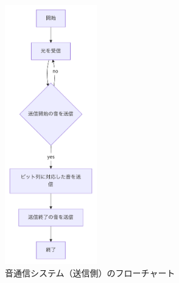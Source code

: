 \documentclass[a4j,11pt,dvipdfmx]{jsarticle}
\begin{document}
\begin{figure}[h]
    \centering
    \includegraphics[width=40mm]{../img/flow_sound_tx-1.pdf}
    \caption{音通信システム（送信側）のフローチャート}
    \label{fig:flow_sound_tx}
\end{figure}
\end{document}
